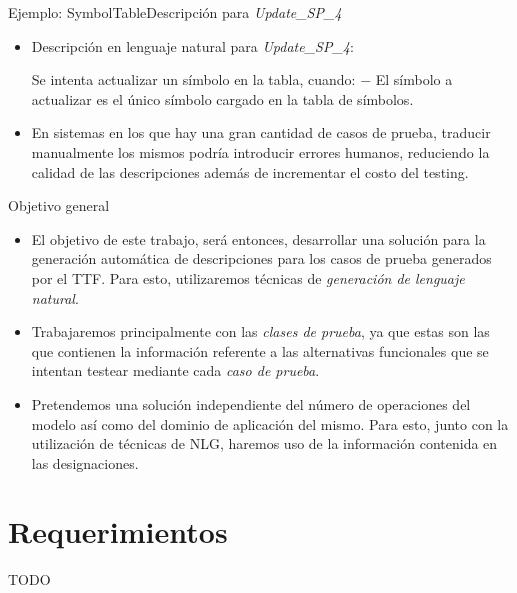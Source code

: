 \documentclass{beamer}
\begin{document}
\begin{frame}{Ejemplo: SymbolTable}{Descripción para \emph{Update\_SP\_4}}

    \begin{itemize}
        \item{
                Descripción en lenguaje natural para \emph{Update\_SP\_4}:\\
		\begin{exampleblock}{Se intenta actualizar un símbolo en la tabla, cuando:}
			$-$ El símbolo a actualizar es el único símbolo cargado en la tabla de símbolos.
		\end{exampleblock}
            }
	\item{
		En sistemas en los que hay una gran cantidad de casos de prueba, traducir manualmente los mismos podría introducir errores humanos, reduciendo la calidad de las descripciones además de incrementar el costo del testing.
	}
    \end{itemize}

\end{frame}

\begin{frame}{Objetivo general}{}
	\begin{itemize}
		\item{
			El objetivo de este trabajo, será entonces, desarrollar una solución para la generación automática de descripciones para los casos de prueba generados por el TTF. Para esto, utilizaremos técnicas de \emph{generación de lenguaje natural}.
		}
		\item{
			Trabajaremos principalmente con las \emph{clases de prueba}, ya que estas son las que contienen la información referente a las alternativas funcionales que se intentan testear mediante cada \emph{caso de prueba}.
		}
		\item{
			Pretendemos una solución independiente del número de operaciones del modelo así como del dominio de aplicación del mismo. Para esto, junto con la utilización de técnicas de NLG, haremos uso de la información contenida en las designaciones.
		}
	\end{itemize}
\end{frame}

\section{Requerimientos}
\begin{frame}{TODO}{}

\end{frame}
\end{document}
